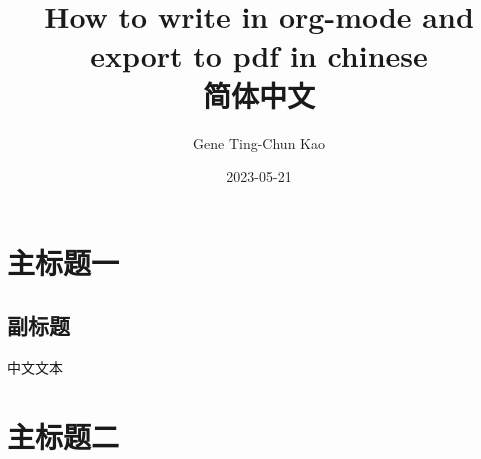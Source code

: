 \documentclass[11pt,a4paper]{article}
\author{Gene Ting-Chun Kao}
\date{2023-05-21}
\title{How to write in org-mode and export to pdf in chinese\\\medskip
\large 简体中文}
\begin{document}
\maketitle
\begin{CJK*}{UTF8}{gbsn}


\section*{主标题一}
\label{sec:org0fceb62}

\subsection*{副标题}
\label{sec:orgcf40631}

中文文本




\section*{主标题二}
\label{sec:orgedb3400}




\end{CJK*}
\end{document}
